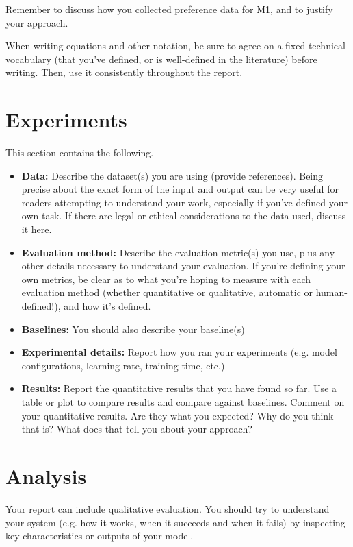 \documentclass[11pt]{article}
\begin{document}
Remember to discuss how you collected preference data for M1, and to justify your approach.

When writing equations and other notation, be sure to agree on a fixed technical vocabulary (that you’ve defined, or is well-defined in the literature) before writing. Then, use it consistently throughout the report.


\section{Experiments}
This section contains the following.

\begin{itemize}
    \item \textbf{Data:} Describe the dataset(s) you are using (provide references). Being precise about the exact form of the input and output can be very useful for readers attempting to understand your work, especially if you’ve defined your own task. If there are legal or ethical considerations to the data used, discuss it here.
    \item \textbf{Evaluation method:} Describe the evaluation metric(s) you use, plus any other details necessary to understand your evaluation. If you’re defining your own metrics, be clear as to what you’re hoping to measure with each evaluation method (whether quantitative or qualitative, automatic or human-defined!), and how it’s defined.
    \item \textbf{Baselines:} You should also describe your baseline(s)
    \item \textbf{Experimental details:} Report how you ran your experiments (e.g. model configurations, learning rate, training time, etc.)
    \item \textbf{Results:} Report the quantitative results that you have found so far. Use a table or plot to compare results and compare against baselines. Comment on your quantitative results. Are they what you expected? Why do you think that is? What does that tell you about your approach?
\end{itemize}



\section{Analysis} 
Your report can include qualitative evaluation. You should try to understand your system (e.g. how it works, when it succeeds and when it fails) by inspecting key characteristics or outputs of your model.
\end{document}
